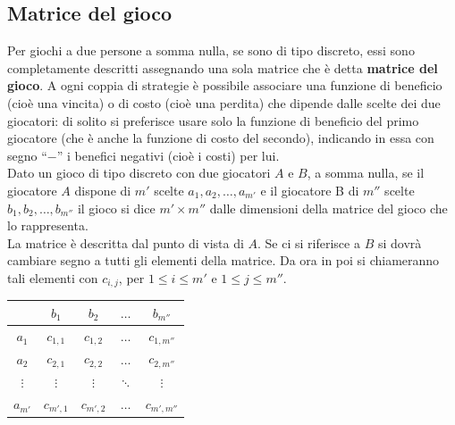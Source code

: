 \documentclass[a4paper]{extarticle}
\newcommand{\quotes}[1]{``#1''}
\renewcommand\arraystretch{}
\begin{document}
\vspace{1em}
\subsection{Matrice del gioco}
Per giochi a due persone a somma nulla, se sono di tipo discreto, essi sono completamente descritti assegnando una sola matrice che è detta \textbf{matrice del gioco}.
A ogni coppia di strategie è possibile associare una funzione di beneficio (cioè una vincita) o di costo (cioè una perdita) che dipende dalle scelte dei due giocatori: di solito si preferisce usare solo la funzione di beneficio del primo giocatore (che è anche la funzione di costo del secondo), indicando in essa con segno \quotes{$-$} i benefici negativi (cioè i costi) per lui.\\
Dato un gioco di tipo discreto con due giocatori $A$ e $B$, a somma nulla, se il giocatore $A$ dispone di $m'$ scelte $a_1, a_2, \dots, a_{m'}$ e il giocatore B di $m''$ scelte $b_1, b_2, \dots, b_{m''}$ il gioco si dice $m' \times m''$ dalle dimensioni della matrice del gioco che lo rappresenta.\\
La matrice è descritta dal punto di vista di $A$. Se ci si riferisce a $B$ si dovrà cambiare segno a tutti gli elementi della matrice. Da ora in poi si chiameranno tali elementi con $c_{i,j}$, per $1 \leq i \leq m'$ e $1 \leq j \leq m''$.

\vspace{1em}
\noindent
\begin{table}[H]
    \setlength{\tabcolsep}{8pt}
    \renewcommand{\arraystretch}{1.5}
    \noindent
    \centering
    \begin{tabular}{|c|cccc|}
        \hline
         & $b_1$ & $b_2$ & $\dots$ & $b_{m''}$\\
        \hline
        $a_1$ & $c_{1,1}$ & $c_{1,2}$ & $\dots$ & $c_{1,m''}$\\
        $a_2$ & $c_{2,1}$ & $c_{2,2}$ & $\dots$ & $c_{2,m''}$\\
        $\vdots$ & $\vdots$ & $\vdots$ & $\ddots$ & $\vdots$\\
        $a_{m'}$ & $c_{m',1}$ & $c_{m',2}$ & $\dots$ & $c_{m',m''}$\\
        \hline
    \end{tabular}
\end{table} 
\end{document}
